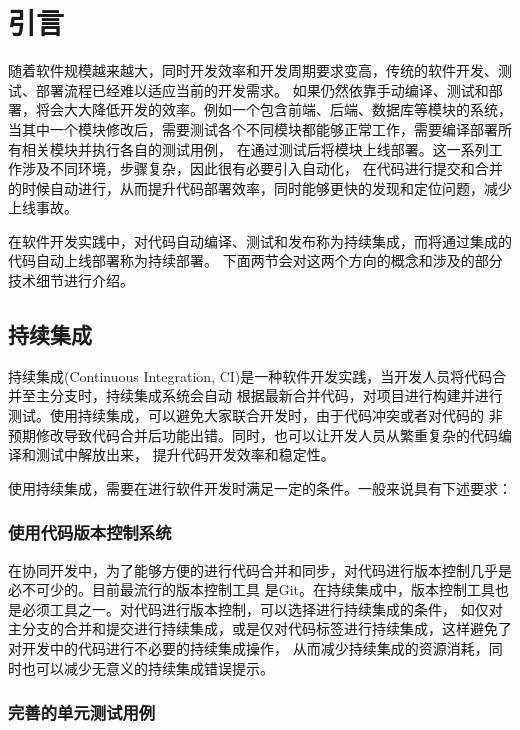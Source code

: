 
\chapter{引言}\label{chap:introduction}

随着软件规模越来越大，同时开发效率和开发周期要求变高，传统的软件开发、测试、部署流程已经难以适应当前的开发需求。
如果仍然依靠手动编译、测试和部署，将会大大降低开发的效率。例如一个包含前端、后端、数据库等模块的系统，
当其中一个模块修改后，需要测试各个不同模块都能够正常工作，需要编译部署所有相关模块并执行各自的测试用例，
在通过测试后将模块上线部署。这一系列工作涉及不同环境，步骤复杂，因此很有必要引入自动化，
在代码进行提交和合并的时候自动进行，从而提升代码部署效率，同时能够更快的发现和定位问题，减少上线事故。

在软件开发实践中，对代码自动编译、测试和发布称为持续集成，而将通过集成的代码自动上线部署称为持续部署。
下面两节会对这两个方向的概念和涉及的部分技术细节进行介绍。

\section{持续集成}

持续集成(Continuous Integration, CI)是一种软件开发实践，当开发人员将代码合并至主分支时，持续集成系统会自动
根据最新合并代码，对项目进行构建并进行测试。使用持续集成，可以避免大家联合开发时，由于代码冲突或者对代码的
非预期修改导致代码合并后功能出错。同时，也可以让开发人员从繁重复杂的代码编译和测试中解放出来，
提升代码开发效率和稳定性。

使用持续集成，需要在进行软件开发时满足一定的条件。一般来说具有下述要求：

\subsection{使用代码版本控制系统}

在协同开发中，为了能够方便的进行代码合并和同步，对代码进行版本控制几乎是必不可少的。目前最流行的版本控制工具
是Git。在持续集成中，版本控制工具也是必须工具之一。对代码进行版本控制，可以选择进行持续集成的条件，
如仅对主分支的合并和提交进行持续集成，或是仅对代码标签进行持续集成，这样避免了对开发中的代码进行不必要的持续集成操作，
从而减少持续集成的资源消耗，同时也可以减少无意义的持续集成错误提示。

\subsection{完善的单元测试用例}

